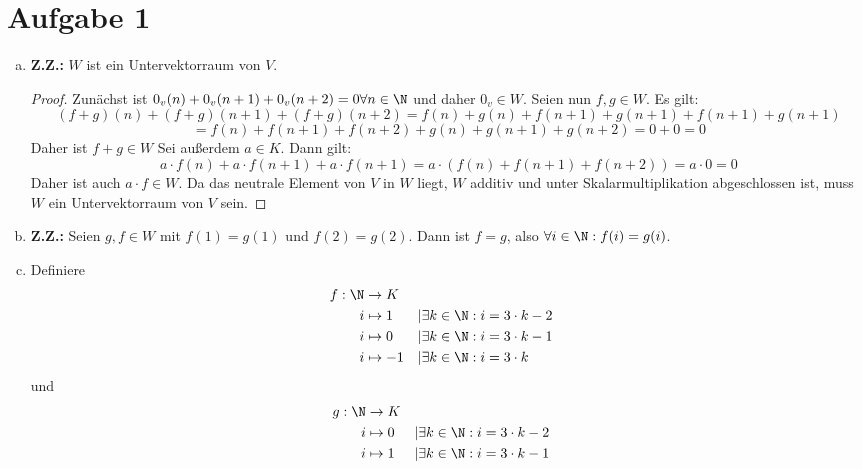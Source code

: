 \documentclass{article}
\begin{document}
	\section*{Aufgabe 1}
	\begin{enumerate}[(a)]
		\item \textbf{Z.Z.:} $W$ ist ein Untervektorraum von $V$.
		\begin{proof}Zunächst ist $0_v(n) + 0_v(n+1) + 0_v(n+2) = 0\forall n\in \N$ und daher $0_v\in W$.
			Seien nun $f,g\in W$. Es gilt:
			\[(f+g)(n) + (f+g)(n+1) + (f+g)(n+2) = f(n) + g(n) + f(n+1) + g(n+1) + f(n+1) + g(n+1) \]
			\[= f(n) + f(n+1) + f(n+2) + g(n) + g(n+1) + g(n+2) = 0 + 0 = 0\]
			Daher ist $f+g\in W$
			Sei außerdem $a\in K$. Dann gilt:
			\[a\cdot f(n) + a\cdot f(n+1) + a\cdot f(n+1) = a\cdot (f(n) + f(n+1) + f(n+2)) = a\cdot 0 = 0\]
			Daher ist auch $a\cdot f\in W$.
			Da das neutrale Element von $V$ in $W$ liegt, $W$ additiv und unter Skalarmultiplikation abgeschlossen ist, muss $W$ ein Untervektorraum von $V$ sein.
		\end{proof}
		\item \textbf{Z.Z.:} Seien $g,f\in W$ mit $f(1) = g(1)$ und $f(2) = g(2)$. Dann ist $f=g$, also $\forall i\in \N: f(i) = g(i)$.
	\item Definiere
	\begin{align*}
		f: \N &\to K\\
		i &\mapsto 1&&|\exists k\in\N: i = 3\cdot k - 2\\
		i &\mapsto 0&&|\exists k\in\N: i = 3\cdot k - 1\\
		i &\mapsto -1&&|\exists k\in \N: i = 3\cdot k\\
	\end{align*}
	und 
	\begin{align*}
		g: \N &\to K\\
		i &\mapsto 0&&|\exists k\in\N: i = 3\cdot k - 2\\
		i &\mapsto 1&&|\exists k\in\N: i = 3\cdot k - 1\\

\end{align*}
\end{enumerate}
\end{document}
